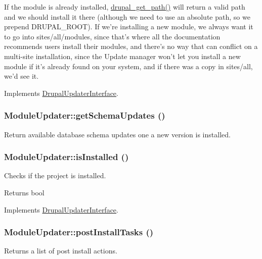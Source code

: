 If the module is already installed, \hyperlink{common_8inc_ae3bbe8f97bf07bb0eaf4580c98f9bf94}{drupal\_\-get\_\-path()} will return a valid path and we should install it there (although we need to use an absolute path, so we prepend DRUPAL\_\-ROOT). If we're installing a new module, we always want it to go into sites/all/modules, since that's where all the documentation recommends users install their modules, and there's no way that can conflict on a multi-\/site installation, since the Update manager won't let you install a new module if it's already found on your system, and if there was a copy in sites/all, we'd see it. 

Implements \hyperlink{interfaceDrupalUpdaterInterface_a2d619c7d5c0e869f13651543587419f1}{DrupalUpdaterInterface}.\hypertarget{classModuleUpdater_a99410051ca3d8785ef39a9cf543c18b0}{
\subsubsection[{getSchemaUpdates}]{\setlength{\rightskip}{0pt plus 5cm}ModuleUpdater::getSchemaUpdates ()}}
\label{classModuleUpdater_a99410051ca3d8785ef39a9cf543c18b0}
Return available database schema updates one a new version is installed. \hypertarget{classModuleUpdater_af9033e41acac0be1e70097ca3303b1ed}{
\subsubsection[{isInstalled}]{\setlength{\rightskip}{0pt plus 5cm}ModuleUpdater::isInstalled ()}}
\label{classModuleUpdater_af9033e41acac0be1e70097ca3303b1ed}
Checks if the project is installed.

\begin{DoxyReturn}{Returns}
bool 
\end{DoxyReturn}


Implements \hyperlink{interfaceDrupalUpdaterInterface_af4e78762c89a91a4a2a7dd2fb325f214}{DrupalUpdaterInterface}.\hypertarget{classModuleUpdater_aca197ac3c04662e4c56c26e839fe01d7}{
\subsubsection[{postInstallTasks}]{\setlength{\rightskip}{0pt plus 5cm}ModuleUpdater::postInstallTasks ()}}
\label{classModuleUpdater_aca197ac3c04662e4c56c26e839fe01d7}
Returns a list of post install actions. 

